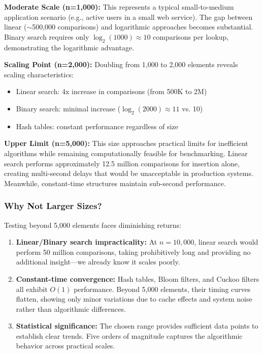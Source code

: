 \textbf{Moderate Scale (n=1,000):} This represents a typical small-to-medium application scenario (e.g., active users in a small web service). The gap between linear ($\sim$500,000 comparisons) and logarithmic approaches becomes substantial. Binary search requires only $\log_2(1000) \approx 10$ comparisons per lookup, demonstrating the logarithmic advantage.

\textbf{Scaling Point (n=2,000):} Doubling from 1,000 to 2,000 elements reveals scaling characteristics:
\begin{itemize}
    \item Linear search: 4x increase in comparisons (from 500K to 2M)
    \item Binary search: minimal increase ($\log_2(2000) \approx 11$ vs. 10)
    \item Hash tables: constant performance regardless of size
\end{itemize}

\textbf{Upper Limit (n=5,000):} This size approaches practical limits for inefficient algorithms while remaining computationally feasible for benchmarking. Linear search performs approximately 12.5 million comparisons for insertion alone, creating multi-second delays that would be unacceptable in production systems. Meanwhile, constant-time structures maintain sub-second performance.

\subsubsection{Why Not Larger Sizes?}

Testing beyond 5,000 elements faces diminishing returns:

\begin{enumerate}
    \item \textbf{Linear/Binary search impracticality:} At $n=10,000$, linear search would perform 50 million comparisons, taking prohibitively long and providing no additional insight---we already know it scales poorly.

    \item \textbf{Constant-time convergence:} Hash tables, Bloom filters, and Cuckoo filters all exhibit $O(1)$ performance. Beyond 5,000 elements, their timing curves flatten, showing only minor variations due to cache effects and system noise rather than algorithmic differences.

    \item \textbf{Statistical significance:} The chosen range provides sufficient data points to establish clear trends. Five orders of magnitude captures the algorithmic behavior across practical scales.
\end{enumerate}

